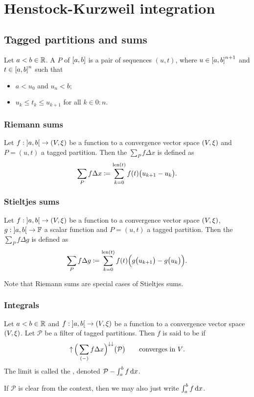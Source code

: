 \section{Henstock-Kurzweil integration}
\subsection{Tagged partitions and sums}
\begin{definition}
Let $a <  b\in \mathbb{R}$. A  $P$ of $\interval{a,b}$ is a pair of sequences $(u,t)$, where $u\in \interval{a,b}^{n+1}$ and $t\in \interval{a,b}^{n}$ such that
\begin{itemize}
\item $a < u_0$ and $u_{n} < b$;
\item $u_{k} \leq t_k \leq u_{k+1}$ for all $k\in 0:n$.
\end{itemize}
\end{definition}

\subsubsection{Riemann sums}
\begin{definition}
Let $f: \interval[o]{a,b}\to \sSet{V,\xi}$ be a function to a convergence vector space $\sSet{V,\xi}$ and $P = (u,t)$ a tagged partition. Then the  $\sum_P f\Delta x$ is defined as
\[ \sum_P f\Delta x \coloneqq \sum_{k = 0}^{\operatorname{len}(t)}f(t)\big(u_{k+1} - u_{k}\big). \]
\end{definition}

\subsubsection{Stieltjes sums}
\begin{definition}
Let $f: \interval[o]{a,b}\to \sSet{V,\xi}$ be a function to a convergence vector space $\sSet{V,\xi}$, $g: \interval[o]{a,b}\to \F$ a scalar function and $P = (u,t)$ a tagged partition. Then the  $\sum_P f\Delta g$ is defined as
\[ \sum_P f \Delta g \coloneqq \sum_{k = 0}^{\operatorname{len}(t)}f(t)\Big(g\big(u_{k+1}\big) - g\big(u_{k}\big)\Big). \]
\end{definition}
Note that Riemann sums are special cases of Stieltjes sums.

\subsubsection{Integrals}
\begin{definition}
Let $a <  b\in \mathbb{R}$ and $f: \interval[o]{a,b}\to \sSet{V,\xi}$ be a function to a convergence vector space $\sSet{V,\xi}$. Let $\mathcal{P}$ be a filter of tagged partitions. Then $f$ is said to be  if
\[ \operatorname{\uparrow}\Big(\sum_{(-)}f\Delta x\Big)^{\downarrow\downarrow}\big(\mathcal{P}\big)\qquad \text{converges in $V$.} \]
The limit is called the , denoted $\mathcal{P}-\int_a^b f\operatorname{d \!}{x}$.
\end{definition}
If $\mathcal{P}$ is clear from the context, then we may also just write $\int_a^b f\operatorname{d \!}{x}$.

